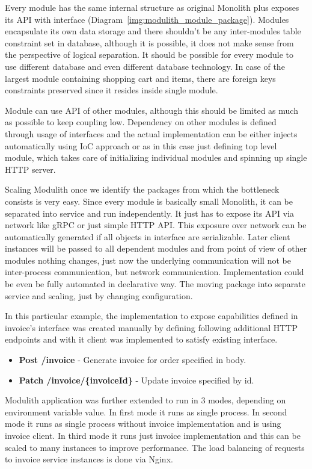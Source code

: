 Every module has the same internal structure as original Monolith plus exposes its API with interface (Diagram~\ref{img:modulith_module_package}). Modules encapsulate its own data storage and there shouldn't be any inter-modules table constraint set in database, although it is possible, it does not make sense from the perspective of logical separation. It should be possible for every module to use different database and even different database technology. In case of the largest module containing shopping cart and items, there are foreign keys constraints preserved since it resides inside single module.

Module can use API of other modules, although this should be limited as much as possible to keep coupling low. Dependency on other modules is defined through usage of interfaces and the actual implementation can be either injects automatically using IoC approach or as in this case just defining top level module, which takes care of initializing individual modules and spinning up single HTTP server.

Scaling Modulith once we identify the packages from which the bottleneck consists is very easy. Since every module is basically small Monolith, it can be separated into service and run independently. It just has to expose its API via network like gRPC or just simple HTTP API. This exposure over network can be automatically generated if all objects in interface are serializable. Later client instances will be passed to all dependent modules and from point of view of other modules nothing changes, just now the underlying communication will not be inter-process communication, but network communication. Implementation could be even be fully automated in declarative way. The moving package into separate service and scaling, just by changing configuration.

In this particular example, the implementation to expose capabilities defined in invoice's interface was created manually by defining following additional HTTP endpoints and with it client was implemented to satisfy existing interface.

\begin{itemize}
    \item \textbf{Post /invoice} - Generate invoice for order specified in body.
    \item \textbf{Patch /invoice/\{invoiceId\}} - Update invoice specified by id.
\end{itemize}

Modulith application was further extended to run in 3 modes, depending on environment variable value. In first mode it runs as single process. In second mode it runs as single process without invoice implementation and is using invoice client. In third mode it runs just invoice implementation and this can be scaled to many instances to improve performance. The load balancing of requests to invoice service instances is done via Nginx.

